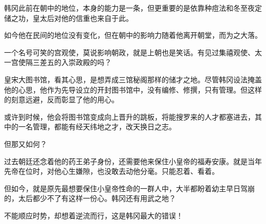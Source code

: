 韩冈此前在朝中的地位，本身的能力是一条，但更重要的是依靠种痘法和冬至夜定储之功，皇太后对他的信重也来自于此。

如今他在民间的地位没有变化，但在朝中的影响力随着他离开朝堂，而为之大落。

一个名号可笑的宫观使，莫说影响朝政，就是上朝也是笑话。有见过集禧观使、太一宫使隔三差五的入崇政殿的吗？

皇宋大图书馆，看其心思，是想弄成三馆秘阁那样的储才之地。尽管韩冈设法掩盖他的心思，他作为先导设立的开封图书馆中，没有编修、修撰，只有管理。但这样的刻意远避，反而彰显了他的用心。

或许到时候，他会将图书馆变成向上晋升的跳板，将能搜罗来的人才都塞进去，其中的一名管理，都能有经天纬地之才，改天换日之志。

但那又如何？

过去朝廷还念着他的药王弟子身份，还需要他来保住小皇帝的福寿安康。就是当年先帝在位时，对他心生嫌隙，也没敢去动他分毫。只能忍着、看着。

但如今，就是原先最想要保住小皇帝性命的一群人中，大半都盼着幼主早日驾崩的，太后都少不了有这样一份心。韩冈还有用武之地？

不能顺应时势，却想着逆流而行，这是韩冈最大的错误！

